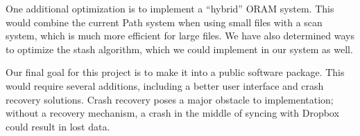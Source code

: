 \documentclass[conference]{IEEEtran}
\begin{document}
One additional optimization is to implement a “hybrid” ORAM system. This would combine the current Path system when using small files with a scan system, which is much more efficient for large files. We have also determined ways to optimize the stash algorithm, which we could implement in our system as well.

Our final goal for this project is to make it into a public software package. This would require several additions, including a better user interface and crash recovery solutions. Crash recovery poses a major obstacle to implementation; without a recovery mechanism, a crash in the middle of syncing with Dropbox could result in lost data.


%
%



%
%
\end{document}
